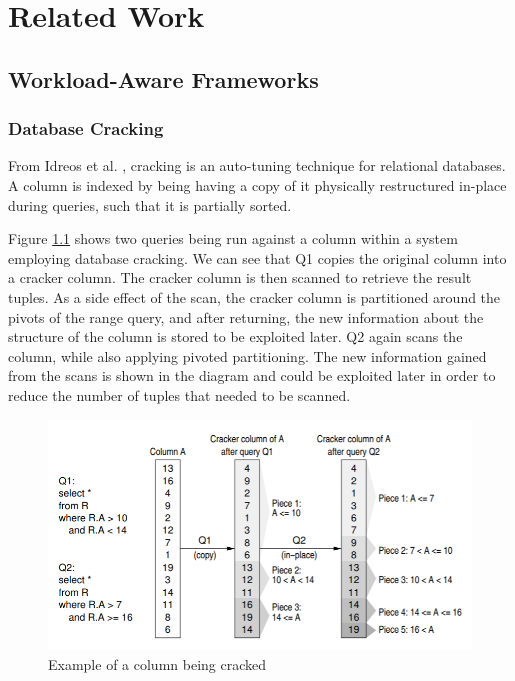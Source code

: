 \chapter{Related Work}

\label{ch:relatedwork}

\section{Workload-Aware Frameworks}

\subsection{Database Cracking}

From Idreos et al. \cite{DBLP:conf/cidr/IdreosKM07}, cracking is an auto-tuning technique for relational databases. A column is indexed by being having a copy of it physically restructured in-place during queries, such that it is partially sorted.

Figure \ref{fig:cracking_img} shows two queries being run against a column within a system employing database cracking. We can see that Q1 copies the original column into a cracker column. The cracker column is then scanned to retrieve the result tuples. As a side effect of the scan, the cracker column is partitioned around the pivots of the range query, and after returning, the new information about the structure of the column is stored to be exploited later. Q2 again scans the column, while also applying pivoted partitioning. The new information gained from the scans is shown in the diagram and could be exploited later in order to reduce the number of tuples that needed to be scanned.

\begin{figure}[h]
  \includegraphics[width=\textwidth]{images/cracking_img}
  \caption{Example of a column being cracked}
  \label{fig:cracking_img}
\end{figure}

